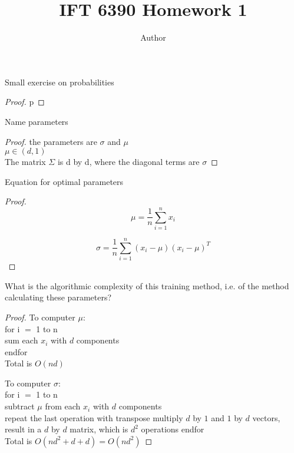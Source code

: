 \documentclass[12pt]{article}
\newenvironment{problem}[2][Problem]{\begin{trivlist}
\item[\hskip \labelsep {\bfseries #1}\hskip \labelsep {\bfseries #2.}]}{\end{trivlist}}
\begin{document}
 
 
\title{IFT 6390 Homework 1}
\author{Author}
\maketitle
 
\begin{problem}{1}
Small exercise on probabilities
\end{problem}
 
\begin{proof}
p
\end{proof}

\begin{problem}{3.1 (a)}
Name parameters
\end{problem}

\begin{proof}
the parameters are $\sigma$ and $\mu$\\
$\mu \in (d , 1)$ \\
The matrix $\Sigma$ is d by d, where the diagonal terms are $\sigma$
\end{proof}

\begin{problem}{3.1 (b)}
Equation for optimal parameters
\end{problem}

\begin{proof}
\begin{equation*}
\mu = \frac{1}{n} \sum_{i=1}^{n} x_i
\end{equation*}

\begin{equation*}
\sigma = \frac{1}{n} \sum_{i=1}^{n} (x_i - \mu) (x_i - \mu)^T 
\end{equation*}
\end{proof}

\begin{problem}{3.1 (c)}
What is the algorithmic complexity of this training method, i.e. of the method calculating these parameters?
\end{problem}

\begin{proof}
To computer $\mu$: \\
for i $=$ 1 to n \\
sum each $x_i$ with $d$ components\\
endfor\\
Total is $O(nd)$

To computer $\sigma$: \\
for i $=$ 1 to n \\
 subtract $\mu$ from each $x_i$ with $d$ components\\
 repeat the last operation with transpose
 multiply $d$ by $1$ and  $1$ by $d$ vectors, result in a $d$ by $d$ matrix, which is $d^2$ operations
endfor\\
Total is $O(nd^2 + d + d ) = O(nd^2)$

\end{proof}
\end{document}
